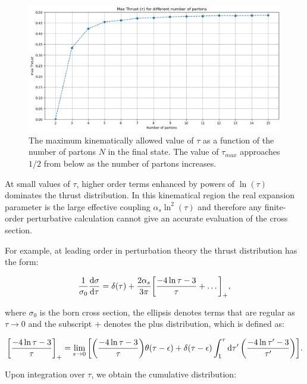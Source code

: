 \documentclass[../Tesi_Jiahao_Miao_986136.tex]{subfiles}
\begin{document}
\begin{figure}[h]
    \centering
    \includegraphics[width=\textwidth]{figures/tau_maxVsN.png}
    \caption{The maximum kinematically allowed value of $\tau$ as a function of the number of partons $N$ in the final state.
    The value of $\tau_{max}$ approaches $1/2$ from below as the number of partons increases.}
    \label{fig:max_tau}
\end{figure}

At small values of $\tau$, higher order terms enhanced by powers of $\ln(\tau)$ dominates the thrust distribution.
In this kinematical region the real expansion parameter is the large effective coupling $\alpha_s \ln^2(\tau)$ and therefore
any finite-order perturbative calculation cannot give an accurate evaluation of the cross section.

For example, at leading order in perturbation theory the thrust distribution has the form:

\begin{equation}\label{eq:LO fixed order}
    \frac{1}{\sigma_0}\dv{\sigma}{\tau} = \delta(\tau) + \frac{2\alpha_s}{3\pi} \qty[\frac{-4 \ln \tau - 3}{\tau} + \dots]_{+} ,
\end{equation}

where $\sigma_0$ is the born cross section, the ellipsis denotes terms that are regular as $\tau \to 0$ and the subscript $+$ denotes the 
plus distribution, which is defined as:

\begin{equation}
    \qty[\frac{-4 \ln \tau - 3}{\tau}]_{+} = \lim_{\epsilon \to 0}\qty[ \qty(\frac{-4 \ln \tau - 3}{\tau}) \theta(\tau - \epsilon) +\delta(\tau - \epsilon)\int_1^{\tau}  \dd{\tau'} \qty(\frac{-4 \ln \tau' - 3}{\tau'})].
\end{equation}

Upon integration over $\tau$, we obtain the cumulative distribution:
\end{document}
